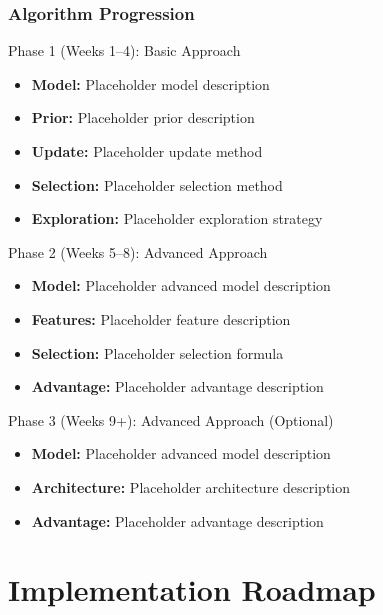 \begin{frame}
\frametitle{Algorithm Progression}
\begin{block}{Phase 1 (Weeks 1--4): Basic Approach}
\begin{itemize}
\item \textbf{Model:} Placeholder model description
\item \textbf{Prior:} Placeholder prior description
\item \textbf{Update:} Placeholder update method
\item \textbf{Selection:} Placeholder selection method
\item \textbf{Exploration:} Placeholder exploration strategy
\end{itemize}
\end{block}

\begin{block}{Phase 2 (Weeks 5--8): Advanced Approach}
\begin{itemize}
\item \textbf{Model:} Placeholder advanced model description
\item \textbf{Features:} Placeholder feature description
\item \textbf{Selection:} Placeholder selection formula
\item \textbf{Advantage:} Placeholder advantage description
\end{itemize}
\end{block}

\begin{block}{Phase 3 (Weeks 9+): Advanced Approach (Optional)}
\begin{itemize}
\item \textbf{Model:} Placeholder advanced model description
\item \textbf{Architecture:} Placeholder architecture description
\item \textbf{Advantage:} Placeholder advantage description
\end{itemize}
\end{block}
\end{frame}

\section{Implementation Roadmap}\label{sec:roadmap}

